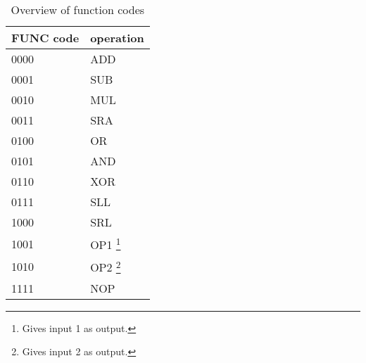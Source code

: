 \begin{savenotes}
\begin{table}[h]
\centering
    \begin{tabular}{| l | l |}
     \hline
     FUNC code & operation \\
     \hline
     0000      & ADD       \\
     0001      & SUB       \\
     0010      & MUL       \\
     0011      & SRA       \\
     0100      & OR        \\
     0101      & AND       \\
     0110      & XOR       \\
     0111      & SLL       \\
     1000      & SRL       \\
     1001      & OP1 \footnote{Gives input 1 as output.}       \\
     1010      & OP2 \footnote{Gives input 2 as output.}      \\
     1111      & NOP       \\
     \hline
   \end{tabular}
    \caption{Overview of function codes}
    \label{fpga:tbl:alu_function_codes_tbl}



\end{table}
\end{savenotes}